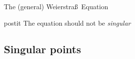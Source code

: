 \documentclass[10pt,handout]{beamer} %
\begin{document}
\begin{frame}{The (general) Weierstra\ss\ Equation}
\begin{center}
\pause
{}\pause
{}\pause
\end{center}

 \begin{beamercolorbox}[sep=1em,wd=6.5cm]{postit}
 The equation should not be \emph{singular}
 \end{beamercolorbox}
\end{frame}

\subsection{Singular points}
\end{document}
